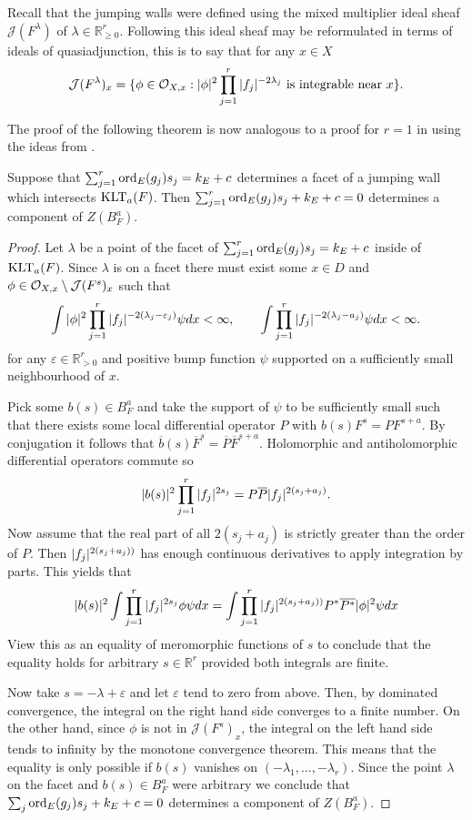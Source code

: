 Recall that the jumping walls were defined using the mixed multiplier ideal sheaf $\mathcal{J}(F^\lambda)$ of $\lambda\in \mathbb{R}^r_{\geq 0}$.
Following \cite[Remark 2.6]{QuasiadjunctionMixed} this ideal sheaf may be reformulated in terms of ideals of quasiadjunction, this is to say that for any $x\in X$
$$\mathcal{J}(F^\lambda)_x = \{\phi \in \mathcal{O}_{X,x}: \vert \phi \vert^2 \prod_{j=1}^r \vert f_j \vert^{-2\lambda_j} \text{ is integrable near }x\}.$$

The proof of the following theorem is now analogous to a proof for $r=1$ in \cite[Theorem B]{ClassicalJump} using the ideas from \cite[Theorem 10.6]{kollar1997singularities}.
\begin{theorem}\label{thm: JumpingWall2}
  Suppose that $\sum_{j=1}^r \operatorname{ord}_E(g_j)s_j = k_E + c$ determines a facet of a jumping wall which intersects $\operatorname{KLT}_{a}(F)$.
  Then $\sum_{j=1}^r \operatorname{ord}_E(g_j)s_j + k_E + c = 0$ determines a component of $Z(B_F^a)$.
\end{theorem}
\begin{proof}
  Let $\lambda$ be a point of the facet of $\sum_{j=1}^r \operatorname{ord}_E(g_j)s_j = k_E + c$ inside of $\operatorname{KLT}_a(F)$.
  Since $\lambda$ is on a facet there must exist some $x\in D$ and $\phi\in \mathcal{O}_{X,x}\setminus \mathcal{J}(F^s)_x$ such that
  $$\int \vert \phi \vert^2\prod_{j=1}^r\vert f_j \vert^{-2(\lambda_j -\varepsilon_j)}\psi dx <  \infty, \qquad \int \prod_{j=1}^r \vert f_j \vert^{-2(\lambda_j - a_j)}\psi dx< \infty.$$
  for any $\varepsilon \in \mathbb{R}_{>0}^r$ and positive bump function $\psi$ supported on a sufficiently small neighbourhood of $x$.

  Pick some $b(s) \in B_F^a$ and take the support of $\psi$ to be sufficiently small such that there exists some local differential operator $P$ with $b(s)F^s = PF^{s+a}$.
  By conjugation it follows that $\overline{b}(s) \overline{F}^s = \overline{P}\overline{F}^{s+a}$.
  Holomorphic and antiholomorphic differential operators commute so
  $$\vert b(s) \vert^2 \prod_{j=1}^r \vert f_j \vert^{2s_j} = P\overline{P} \vert f_j \vert^{2(s_j + a_j)}.$$
  Now assume that the real part of all $2(s_j+a_j)$ is strictly greater than the order of $P$. Then $\vert f_j \vert^{2(s_j+a_j))}$ has enough continuous derivatives to apply integration by parts.
  This yields that
  $$\vert b(s) \vert^2 \int \prod_{j=1}^r\vert f_j \vert^{2s_j}\phi \psi dx= \int \prod_{j=1}^r  \vert f_j \vert^{2(s_j+a_j))} P^*\overline{P^*}\vert \phi \vert^2\psi dx$$
  View this as an equality of meromorphic functions of $s$ to conclude that the equality holds for arbitrary $s\in \mathbb{R}^r$ provided both integrals are finite.

  Now take $s = -\lambda + \varepsilon$ and let $\varepsilon$ tend to zero from above.
  Then, by dominated convergence, the integral on the right hand side converges to a finite number.
  On the other hand, since $\phi$ is not in $\mathcal{J}(F^s)_x$, the integral on the left hand side tends to infinity by the monotone convergence theorem.
  This means that the equality is only possible if $b(s)$ vanishes on $(-\lambda_1,\ldots, -\lambda_r)$.
  Since the point $\lambda$ on the facet and $b(s)\in B_F^a$ were arbitrary we conclude that $\sum_j \operatorname{ord}_{E}(g_j)s_j +  k_E + c=0$ determines a component of $Z(B_F^a)$.
\end{proof}
